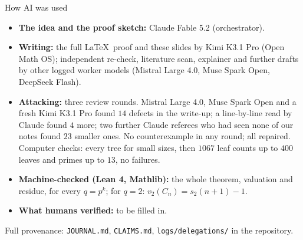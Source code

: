 \documentclass[aspectratio=169,11pt]{beamer}
\begin{document}
\begin{frame}{How AI was used}
  \begin{itemize}
    \item \textbf{The idea and the proof sketch:} Claude Fable 5.2 (orchestrator).
    \item \textbf{Writing:} the full \LaTeX\ proof and these slides by Kimi K3.1 Pro
      (Open Math OS); independent re-check, literature scan, explainer and further
      drafts by other logged worker models (Mistral Large 4.0, Muse Spark Open,
      DeepSeek Flash).
    \item \textbf{Attacking:} three review rounds. Mistral Large 4.0, Muse Spark Open
      and a fresh Kimi K3.1 Pro found $14$ defects in the write-up; a line-by-line
      read by Claude found $4$ more; two further Claude referees who had seen none
      of our notes found $23$ smaller ones. No counterexample in any round; all
      repaired. Computer checks: every tree for small sizes, then $1067$ leaf counts
      up to $400$ leaves and primes up to $13$, no failures.
    \item \textbf{Machine-checked (Lean 4, Mathlib):} the whole theorem, valuation
      and residue, for every $q=p^k$; for $q=2$: $v_2(C_n)=s_2(n+1)-1$.
    \item \textbf{What humans verified:} \alert{to be filled in.}
  \end{itemize}
  \vfill
  {\small Full provenance: \texttt{JOURNAL.md}, \texttt{CLAIMS.md},
  \texttt{logs/delegations/} in the repository.}
\end{frame}
\end{document}
